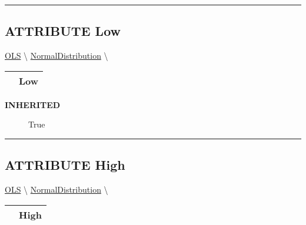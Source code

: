 \rule{\linewidth}{0.5pt}

\subsection*{\textsf{\colorbox{headtoc}{\color{white} ATTRIBUTE}
Low}}

\hypertarget{ecldoc:linearregression.ols.distributionbase.low}{}
\hspace{0pt} \hyperlink{ecldoc:linearregression.ols}{OLS} \textbackslash 
\hspace{0pt} \hyperlink{ecldoc:linearregression.ols.normaldistribution}{NormalDistribution} \textbackslash 

{\renewcommand{\arraystretch}{1.5}
\begin{tabularx}{\textwidth}{|>{\raggedright\arraybackslash}l|X|}
\hline
\hspace{0pt}\mytexttt{\color{red} } & \textbf{Low} \\
\hline
\end{tabularx}
}

\par

\par
\begin{description}
\item [\colorbox{tagtype}{\color{white} \textbf{\textsf{INHERITED}}}] \textbf{\underline{}} True
\end{description}

\rule{\linewidth}{0.5pt}
\subsection*{\textsf{\colorbox{headtoc}{\color{white} ATTRIBUTE}
High}}

\hypertarget{ecldoc:linearregression.ols.distributionbase.high}{}
\hspace{0pt} \hyperlink{ecldoc:linearregression.ols}{OLS} \textbackslash 
\hspace{0pt} \hyperlink{ecldoc:linearregression.ols.normaldistribution}{NormalDistribution} \textbackslash 

{\renewcommand{\arraystretch}{1.5}
\begin{tabularx}{\textwidth}{|>{\raggedright\arraybackslash}l|X|}
\hline
\hspace{0pt}\mytexttt{\color{red} } & \textbf{High} \\
\hline
\end{tabularx}
}

\par


